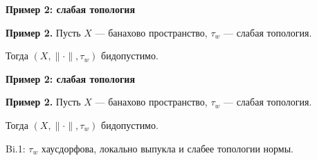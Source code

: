 \documentclass[11pt]{article}
\begin{document}
\newpage

\begin{center}
{\color{notaeYELLOW}\bfseries\fontsize{44}{52}\selectfont Пример 2: слабая топология}
\end{center}
\vspace*{\fill}
\begin{center}
\fontsize{36}{43}\selectfont
\parbox{\linewidth}{\centering\noindent \textbf{Пример 2.} Пусть $X$ --- банахово пространство, $\tau_w$ --- слабая топология.
\par}\vspace{0.4in}
\parbox{\linewidth}{\centering\noindent Тогда $(X,\|\cdot\|,\tau_w)$ бидопустимо.
\par}\vspace{0.4in}
\end{center}
\vspace*{\fill}

\newpage

\begin{center}
{\color{notaeYELLOW}\bfseries\fontsize{44}{52}\selectfont Пример 2: слабая топология}
\end{center}
\vspace*{\fill}
\begin{center}
\fontsize{36}{43}\selectfont
\parbox{\linewidth}{\centering\noindent \textbf{Пример 2.} Пусть $X$ --- банахово пространство, $\tau_w$ --- слабая топология.
\par}\vspace{0.4in}
\parbox{\linewidth}{\centering\noindent Тогда $(X,\|\cdot\|,\tau_w)$ бидопустимо.
\par}\vspace{0.4in}
\parbox{\linewidth}{\centering\noindent Bi.1: $\tau_w$ хаусдорфова, локально выпукла и слабее топологии нормы.
\par}\vspace{0.4in}
\end{center}
\vspace*{\fill}

\newpage
\end{document}

